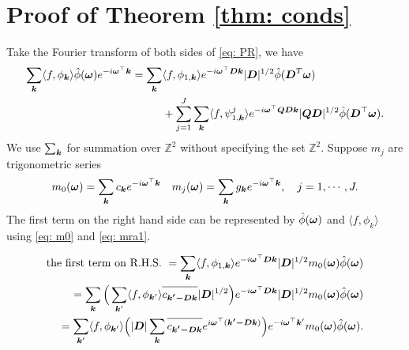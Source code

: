 \section{Proof of Theorem \ref{thm: conds}}\label{app: cond-thm}
Take the Fourier transform of both sides of \eqref{eq: PR}, we have 
\begin{align*}
\sum_{\boldsymbol{k}}\langle f,\phi_{\boldsymbol{k}}\rangle\hat{\phi}(\boldsymbol{\omega})e^{-i\boldsymbol{\omega}^\top\boldsymbol{k}} = \sum_{\boldsymbol{k}}&\langle f,\phi_{1,\boldsymbol{k}}\rangle e^{-i\boldsymbol{\omega}^\top\boldsymbol{Dk}}|\boldsymbol{D}|^{1/2}\hat{\phi}(\boldsymbol{D}^T\boldsymbol{\omega}) \\
&+ \sum_{j=1}^J\sum_{\boldsymbol{k}}\langle f,\psi^j_{1,\boldsymbol{k}}\rangle e^{-i\boldsymbol{\omega}^\top\boldsymbol{QDk}}|\boldsymbol{QD}|^{1/2}\hat{\phi}(\boldsymbol{D}^\top\boldsymbol{\omega}).
\end{align*}
We use $\sum_{\boldsymbol{k}}$ for summation over $\mathbb{Z}^2$ without specifying the set $\mathbb{Z}^2$.
Suppose $m_j$ are trigonometric series
\begin{align}\label{eq: mra1}
m_0(\boldsymbol{\omega}) = \sum_{\boldsymbol{k}} c_{\boldsymbol{k}}e^{-i \boldsymbol{\omega}^\top\boldsymbol{k}} \quad
m_j(\boldsymbol{\omega}) = \sum_{\boldsymbol{k}} g_{\boldsymbol{k}}e^{-i \boldsymbol{\omega}^\top\boldsymbol{k}},\quad j=1,\cdots,J.
\end{align}
The first term on the right hand side can be represented by $\hat{\phi}(\boldsymbol{\omega})$ and $\langle f,\phi_k\rangle$ using \eqref{eq: m0} and \eqref{eq: mra1}.

\begin{align*}
\text{the first term on R.H.S. } = \sum_{\V{k}}\langle f,\phi_{1,\V{k}}\rangle e^{-i\V{\omega}^\top\V{Dk}}|\V{D}|^{1/2}m_0(\V{\omega})\hat{\phi}(\V{\omega}) \\= \sum_{\V{k}}\Big(\sum_{\V{k}'}\langle f,\phi_{\V{k}'}\rangle\overlinespace{c_{\V{k'-Dk}}}|\V{D}|^{1/2}\Big)e^{-i\V{\omega}^\top\V{Dk}}|\V{D}|^{1/2}m_0(\V{\omega})\hat{\phi}(\V{\omega})\\
=\sum_{\V{k}'}\langle f,\phi_{\V{k}'}\rangle\Big(|\V{D}|\sum_{\V{k}}\overlinespace{c_{\V{k'-Dk}}}e^{i\V{\omega}^\top(\V{k'-Dk})}\Big)e^{-i\V{\omega} ^\top\V{k}'} m_0(\V{\omega})\hat{\phi}(\V{\omega}).
\end{align*}

